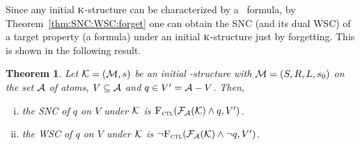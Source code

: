 \documentclass{article}
\newtheorem{theorem}{Theorem}
\begin{document}
Since any initial $\textsc{k}$-structure can be characterized by a \CTL\ formula, by  Theorem~\ref{thm:SNC:WSC:forget} one can obtain the SNC (and its dual WSC) of a target property (a formula) under an initial $\textsc{k}$-structure just by forgetting. This is shown in the following result.
\begin{theorem}\label{thm:inK:SNC}
Let ${\cal K}= ({\cal M}, s)$ be an initial \MPK-structure with ${\cal M}=(S,R,L,s_0)$ on the set ${\cal A}$ of atoms, $V \subseteq {\cal A}$ and $q\in V' = {\cal A} - V$. Then,
 \begin{enumerate}[(i)]
   \item the SNC of $q$ on $V$ under ${\cal K}$ is ${\textsc{F}_{\textsc{ctl}}}({\cal F}_{{\cal A}}({\cal K}) \wedge q, V')$.
   \item the WSC of $q$ on $V$ under ${\cal K}$ is $\neg {\textsc{F}_{\textsc{ctl}}}({\cal F}_{{\cal A}}({\cal K}) \wedge \neg q, V')$.
 \end{enumerate}
\end{theorem}
%
\end{document}
